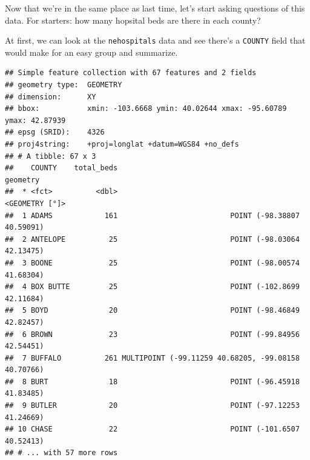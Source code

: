 \documentclass[]{book}
\newenvironment{Shaded}{\begin{snugshade}}{\end{snugshade}}
\newcommand{\DataTypeTok}[1]{\textcolor[rgb]{0.13,0.29,0.53}{#1}}
\newcommand{\KeywordTok}[1]{\textcolor[rgb]{0.13,0.29,0.53}{\textbf{#1}}}
\newcommand{\NormalTok}[1]{#1}
\newcommand{\OperatorTok}[1]{\textcolor[rgb]{0.81,0.36,0.00}{\textbf{#1}}}
\newcommand{\StringTok}[1]{\textcolor[rgb]{0.31,0.60,0.02}{#1}}
\begin{document}
\begin{Shaded}
\end{Shaded}

Now that we're in the same place as last time, let's start asking questions of this data. For starters: how many hopsital beds are there in each county?

At first, we can look at the \texttt{nehospitals} data and see there's a \texttt{COUNTY} field that would make for an easy group and summarize.

\begin{Shaded}
\end{Shaded}

\begin{verbatim}
## Simple feature collection with 67 features and 2 fields
## geometry type:  GEOMETRY
## dimension:      XY
## bbox:           xmin: -103.6668 ymin: 40.02644 xmax: -95.60789 ymax: 42.87939
## epsg (SRID):    4326
## proj4string:    +proj=longlat +datum=WGS84 +no_defs
## # A tibble: 67 x 3
##    COUNTY    total_beds                                            geometry
##  * <fct>          <dbl>                                      <GEOMETRY [°]>
##  1 ADAMS            161                          POINT (-98.38807 40.59091)
##  2 ANTELOPE          25                          POINT (-98.03064 42.13475)
##  3 BOONE             25                          POINT (-98.00574 41.68304)
##  4 BOX BUTTE         25                          POINT (-102.8699 42.11684)
##  5 BOYD              20                          POINT (-98.46849 42.82457)
##  6 BROWN             23                          POINT (-99.84956 42.54451)
##  7 BUFFALO          261 MULTIPOINT (-99.11259 40.68205, -99.08158 40.70766)
##  8 BURT              18                          POINT (-96.45918 41.83485)
##  9 BUTLER            20                          POINT (-97.12253 41.24669)
## 10 CHASE             22                          POINT (-101.6507 40.52413)
## # ... with 57 more rows
\end{verbatim}
\end{document}
